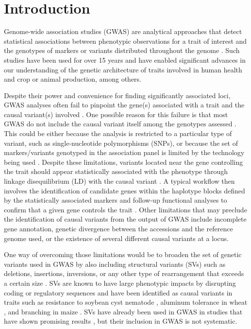 \section*{Introduction}
\label{sv-gwas-introduction}

Genome-wide association studies (GWAS) are analytical approaches that detect
statistical associations between phenotypic observations for a trait of
interest and the genotypes of markers or variants distributed throughout the
genome \citep{tam2019}.  Such studies have been used for over 15 years
\citep{visscher2012} and have enabled significant advances in our understanding
of the genetic architecture of traits involved in human health
\citep[e.g.][]{wellcome2007gwas} and crop \citep{tibbs2021} or animal
\citep{ma2019} production, among others.

Despite their power and convenience for finding significantly associated loci,
GWAS analyses often fail to pinpoint the gene(s) associated with a trait and
the causal variant(s) involved \citep{tam2019}.  One possible reason for this
failure is that most GWAS do not include the causal variant itself among the
genotypes assessed \citep{tibbs2021}. This could be either because the analysis
is restricted to a particular type of variant, such as single-nucleotide
polymorphisms (SNPs), or because the set of markers/variants genotyped in the
association panel is limited by the technology being used
\citep[e.g.][]{bandillo2015, sonah2015}.  Despite these limitations, variants
located near the gene controlling the trait should appear statistically
associated with the phenotype through linkage disequilibrium (LD) with the
causal variant \citep{korte2013}.  A typical workflow then involves the
identification of candidate genes within the haplotype blocks defined by the
statistically associated markers and follow-up functional analyses to confirm
that a given gene controls the trait \citep[e.g.][]{wang2018, liu2020ps}.
Other limitations that may preclude the identification of causal variants from
the output of GWAS include incomplete gene annotation, genetic divergence
between the accessions and the reference genome used, or the existence of
several different causal variants at a locus.

One way of overcoming those limitations would be to broaden the set of genetic
variants used in GWAS by also including structural variants (SVs) such as
deletions, insertions, inversions, or any other type of rearrangement that
exceeds a certain size \cite[typically 50 bp; ][]{ho2020}.  SVs are known to
have large phenotypic impacts by disrupting coding or regulatory sequences
\citep{marroni2014} and have been identified as causal variants in traits such
as resistance to soybean cyst nematode \citep{cook2012}, aluminum tolerance in
wheat \citep{maron2013}, and branching in maize \citep{studer2011}.  SVs have
already been used in GWAS in studies that have shown promising results
\citep[e.g.][]{zhang2015, akakpo2020, dominguez2020, liu2020-pangenome}, but
their inclusion in GWAS is not systematic.

